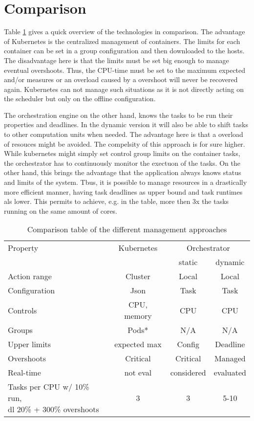 \documentclass[]{scrartcl}
\begin{document}
\section{Comparison}

Table \ref{tab:approach} gives a quick overview of the technologies in comparison.
The advantage of Kubernetes is the centralized management of containers. The limits for each container can be set in a group configuration and then downloaded to the hosts. The disadvantage here is that the limits must be set big enough to manage eventual overshoots. Thus, the CPU-time must be set to the maximum expected and/or measures or an overload caused by a overshoot will never be recovered again.
Kubernetes can not manage such situations as it is not directly acting on the scheduler but only on the offline configuration.

The orchestration engine on the other hand, knows the tasks to be run their properties and deadlines. In the dynamic version it will also be able to shift tasks to other computation units when needed. The advantage here is that a overload of resouces might be avoided.
The compelsity of this approach is for sure higher. While kubernetes might simply set control group limits on the container tasks, the orchestrator has to continuously monitor the exectuon of the tasks.
On the other hand, this brings the advantage that the application always knows status and limits of the system. Tbus, it is possible to manage resources in a drastically more efficient manner, having task deadlines as upper bound and task runtimes als lower. This permits to achieve, e.g. in the table, more then 3x the tasks running on the same amount of cores.

\begin{table}[ht]
	\centering
	\begin{tabular}{l c c c}
		Property & Kubernetes & \multicolumn{2}{c}{Orchestrator} \\
		& & static & dynamic \\
		\toprule
		Action range & Cluster & Local & Local \\
		Configuration & Json & Task & Task \\
		\midrule
		Controls & CPU, memory & CPU & CPU \\
		Groups & Pods* & N/A & N/A\\
		\midrule
		Upper limits & expected max & Config & Deadline \\
		Overshoots & Critical & Critical & Managed \\
		Real-time & not eval & considered & evaluated \\
		\midrule
		\shortstack{Tasks per CPU w/ 10\% run,\\
		 dl 20\% + 300\% overshoots} & 3 & 3 & 5-10\\		
		\bottomrule
	\end{tabular}
	\caption{Comparison table of the different management approaches}
	\label{tab:approach}
\end{table}
\end{document}
